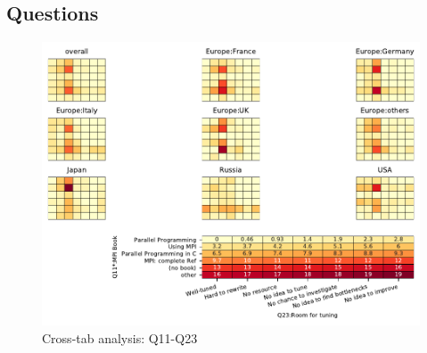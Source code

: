 
\subsection{Questions}


\begin{figure}
\begin{center}
\includegraphics[width=12cm]{../pdfs/Q11-Q23.pdf}
\caption{Cross-tab analysis: Q11-Q23}
\label{fig:Q11-Q23}
\end{center}
\end{figure}
